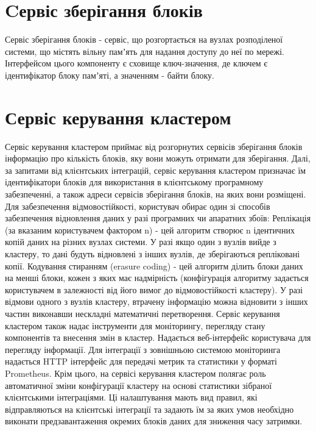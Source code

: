 \section {Cервіс зберігання блоків}

Сервіс зберігання блоків - сервіс, що розгортається на вузлах розподіленої системи, що містять вільну памʼять для надання доступу до неї по мережі.
	Інтерфейсом цього компоненту є сховище ключ-значення, де ключем є ідентифікатор блоку памʼяті, а значенням - байти блоку.

\section {Сервіс керування кластером}

Сервіс керування кластером приймає від розгорнутих сервісів зберігання блоків інформацію про кількість блоків, яку вони можуть отримати для зберігання. Далі, за запитами від клієнтських інтеграцій, сервіс керування кластером призначає їм ідентифікатори блоків для використання в клієнтському програмному забезпеченні, а також адреси сервісів зберігання блоків, на яких вони розміщені.
	Для забезпечення відмовостійкості, користувач обирає один зі способів забезпечення відновлення даних у разі програмних чи апаратних збоїв:
Реплікація (за вказаним користувачем фактором n) - цей алгоритм створює n ідентичних копій даних на різних вузлах системи. У разі якщо один з вузлів вийде з кластеру, то дані будуть відновлені з інших вузлів, де зберігаються репліковані копії.
Кодування стиранням (erasure coding) - цей алгоритм ділить блоки даних на менші блоки, кожен з яких має надмірність (конфігурація алгоритму задається користувачем в залежності від його вимог до відмовостійкості кластеру). У разі відмови одного з вузлів кластеру, втрачену інформацію можна відновити з інших частин виконавши нескладні математичні перетворення.
Сервіс керування кластером також надає інструменти для моніторингу, перегляду стану компонентів та внесення змін в кластер. Надається веб-інтерфейс користувача для перегляду інформації. Для інтеграції з зовнішньою системою моніторинга надається HTTP інтерфейс для передачі метрик та статистики у форматі Prometheus.
Крім цього, на сервісі керування кластером полягає роль автоматичної зміни конфігурації кластеру на основі статистики зібраної клієнтськими інтеграціями. Ці налаштування мають вид правил, які відправляються на клієнтські інтеграції та задають їм за яких умов необхідно виконати предзавантаження окремих блоків даних для зниження часу затримки.

